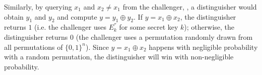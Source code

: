 \documentclass{article}
\begin{document}
\bigskip
Similarly, by querying $x_{1}$ and $x_{2}\neq x_{1}$ from the challenger, , a distinguisher would obtain $y_{1}$ and $y_{2}$ and compute $y = y_{1}\oplus y_{2}$. If $y= x_{1}\oplus x_{2}$, the distinguisher returns $1$ (i.e. the challenger uses $E_{k}^{''}$ for some secret key $k$); otherwise, the distinguisher returns $0$ (the challenger uses a permutation randomly drawn from all permutations of $\{0, 1\}^{n}$). Since $y= x_{1}\oplus x_{2}$ happens with negligible probability with a random permutation, the distinguisher will win with non-negligible probability. 
\end{document}
